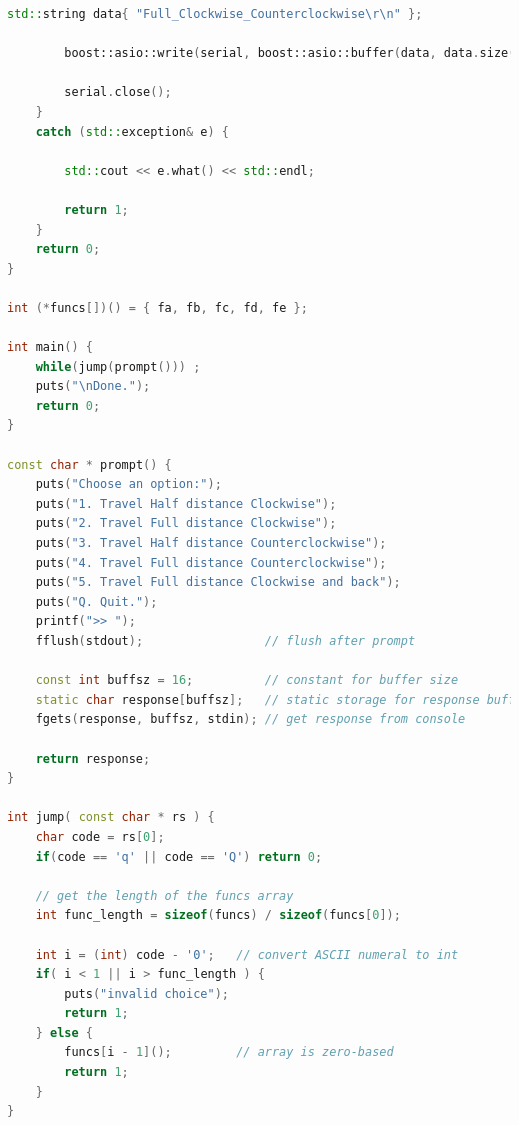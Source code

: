 \documentclass[transmag]{IEEEtran}
\begin{document}
\begin{lstlisting}[language=C++, caption=PC controller program - Serial Communication - Main file]
        std::string data{ "Full_Clockwise_Counterclockwise\r\n" };

        boost::asio::write(serial, boost::asio::buffer(data, data.size()));

        serial.close();
    }
    catch (std::exception& e) {

        std::cout << e.what() << std::endl;

        return 1;
    }
    return 0;
}

int (*funcs[])() = { fa, fb, fc, fd, fe };

int main() {
    while(jump(prompt())) ;
    puts("\nDone.");
    return 0;
}

const char * prompt() {
    puts("Choose an option:");
    puts("1. Travel Half distance Clockwise");
    puts("2. Travel Full distance Clockwise");
    puts("3. Travel Half distance Counterclockwise");
    puts("4. Travel Full distance Counterclockwise");
    puts("5. Travel Full distance Clockwise and back");
    puts("Q. Quit.");
    printf(">> ");
    fflush(stdout);                 // flush after prompt
    
    const int buffsz = 16;          // constant for buffer size
    static char response[buffsz];   // static storage for response buffer
    fgets(response, buffsz, stdin); // get response from console
    
    return response;
}

int jump( const char * rs ) {
    char code = rs[0];
    if(code == 'q' || code == 'Q') return 0;
    
    // get the length of the funcs array
    int func_length = sizeof(funcs) / sizeof(funcs[0]);
    
    int i = (int) code - '0';   // convert ASCII numeral to int
    if( i < 1 || i > func_length ) {
        puts("invalid choice");
        return 1;
    } else {
        funcs[i - 1]();         // array is zero-based
        return 1;
    } 
}
\end{lstlisting}


\clearpage
\newpage
\end{document}
